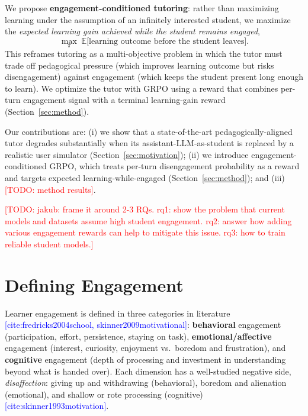 \documentclass[11pt]{article}
\newcommand{\cit}[1]{\textcolor{blue}{[\textsf{cite:#1}]}}
\newcommand{\todo}[1]{\textcolor{red}{[TODO: #1]}}
\begin{document}
We propose \textbf{engagement-conditioned tutoring}: rather than maximizing learning under the assumption of an infinitely interested student, we maximize the \emph{expected learning gain achieved while the student remains engaged},
\[
  \max_{\pi}\; \mathbb{E}\big[\text{learning outcome before the student leaves}\big].
\]
This reframes tutoring as a multi-objective problem in which the tutor must
trade off pedagogical pressure (which improves learning outcome but risks
disengagement) against engagement (which keeps the student present long enough to
learn). 
We optimize the tutor with GRPO using a reward that combines per-turn engagement signal with a terminal learning-gain reward (Section~\ref{sec:method}).

Our contributions are: (i) we show that a state-of-the-art pedagogically-aligned tutor degrades substantially when its assistant-LLM-as-student is replaced by a realistic user simulator (Section~\ref{sec:motivation}); 
(ii) we introduce engagement-conditioned GRPO, which treats per-turn disengagement probability as a reward and targets expected learning-while-engaged (Section~\ref{sec:method}); 
and (iii) \todo{method results}.

\todo{jakub: frame it around 2-3 RQs. rq1: show the problem that current models and datasets assume high student engagement. rq2: answer how adding various engagement rewards can help to mitigate this issue. rq3: how to train reliable student models.}

\section{Defining Engagement}
\label{sec:defining-engagement}


Learner engagement is defined in three categories in literature \cit{fredricks2004school, skinner2009motivational}:
\textbf{behavioral} engagement (participation, effort, persistence, staying on task), 
\textbf{emotional/affective} engagement (interest, curiosity, enjoyment vs.\ boredom and frustration), 
and \textbf{cognitive} engagement (depth of processing and investment in understanding beyond what is handed
over). 
Each dimension has a well-studied negative side, \emph{disaffection}: giving up and withdrawing (behavioral), boredom and alienation (emotional), and shallow or rote processing (cognitive) \cit{skinner1993motivation}. 
\end{document}
